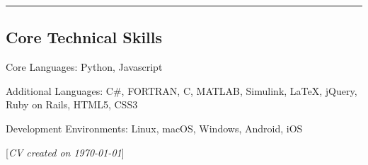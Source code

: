\documentclass[10pt,letterpaper]{article}
\newcommand{\CVNote}{CV created on {\today}}
\newenvironment{indentsection}[1]%
{\begin{list}{}%
    {\setlength{\leftmargin}{#1}}%
    \item[]%
}
{\end{list}}
\newcommand{\CPP}
{C\nolinebreak[4]\hspace{-.05em}\raisebox{.22ex}{\footnotesize\bf ++}}
\begin{document}

% 




\hrule
\vspace{-0.4em}
\subsection*{Core Technical Skills}

\begin{indentsection}{\parindent}
    \begin{description*}
        \item[Core Languages:]
        Python, Javascript
        \item[Additional Languages:]
        C\#, FORTRAN, \CPP, MATLAB, Simulink, \LaTeX, jQuery, Ruby on Rails, HTML5, CSS3
        \item[Development Environments:]
        Linux, macOS, Windows, Android, iOS
    \end{description*}
\end{indentsection}



\null\hfill%
[\textit{\CVNote}]%
\hspace{2.0mm}\null
\end{document}
